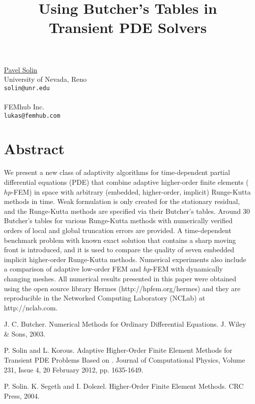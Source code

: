 \title{Using Butcher's Tables in Transient PDE Solvers}
 \author{} \institute{}
\maketitle
\begin{center}
{\large \underline{Pavel Solin}}\\
University of Nevada, Reno\\
{\tt solin@unr.edu}
\\ \vspace{4mm}{\large Lukas Korous}\\
FEMhub Inc.\\
{\tt lukas@femhub.com}

\end{center}

\section*{Abstract}

We present a new class of adaptivity algorithms for time-dependent partial differential 
equations (PDE) that combine adaptive higher-order finite elements ($hp$-FEM) in space with 
arbitrary (embedded, higher-order, implicit) Runge-Kutta methods in time. Weak formulation 
is only created for the stationary residual, and the Runge-Kutta
methods are specified via their Butcher's tables. Around 30 Butcher's 
tables for various Runge-Kutta methods with numerically verified 
orders of local and global truncation errors are provided. A time-dependent benchmark 
problem with known exact solution that contains a sharp moving front 
is introduced, and it is used to compare the quality of seven embedded implicit higher-order Runge-Kutta 
methods. Numerical experiments also include a comparison of adaptive low-order FEM and 
$hp$-FEM with dynamically changing meshes. All numerical results presented in this paper 
were obtained using the open source library Hermes (http://hpfem.org/hermes) and they are
reproducible in the Networked Computing Laboratory (NCLab) at http://nclab.com. 


\begin{thebibliography}{10}

{\sc J. C. Butcher}. {Numerical Methods for Ordinary Differential Equations}. J. Wiley \& Sons, 2003.



{\sc P. Solin and L. Korous}. {Adaptive Higher-Order Finite Element Methods for Transient PDE Problems Based on }. Journal of Computational Physics, Volume 231, Issue 4, 20 February 2012, pp. 1635-1649.



{\sc P. Solin. K. Segeth and I. Dolezel}. {Higher-Order Finite Element Methods}. CRC Press, 2004.

\end{thebibliography}

